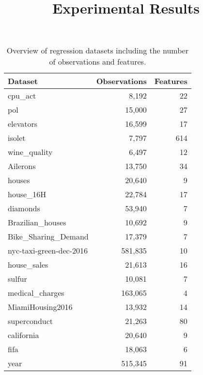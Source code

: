 \documentclass{article}
\begin{document}
\title{Experimental Results}
\author{}
\date{}

\maketitle

\begin{table}[ht]
    \centering
    \begin{tabular}{lrr}
    \hline
    \textbf{Dataset} & \textbf{Observations} & \textbf{Features} \\ \hline
    cpu\_act                & 8,192    & 22  \\
    pol                     & 15,000   & 27  \\
    elevators             & 16,599   & 17  \\
    isolet                  & 7,797    & 614 \\
    wine\_quality          & 6,497    & 12  \\
    Ailerons              & 13,750   & 34  \\
    houses                & 20,640   & 9   \\
    house\_16H            & 22,784   & 17  \\
    diamonds              & 53,940   & 7   \\
    Brazilian\_houses     & 10,692   & 9   \\
    Bike\_Sharing\_Demand  & 17,379   & 7   \\
    nyc-taxi-green-dec-2016& 581,835  & 10  \\
    house\_sales          & 21,613   & 16  \\
    sulfur                & 10,081   & 7   \\
    medical\_charges      & 163,065  & 4   \\
    MiamiHousing2016      & 13,932   & 14  \\
    superconduct          & 21,263   & 80  \\
    california            & 20,640   & 9   \\
    fifa                  & 18,063   & 6   \\
    year                  & 515,345  & 91  \\ \hline
    \end{tabular}
    \caption{Overview of regression datasets including the number of observations and features.}
    \label{tab:datasets}
    \end{table}
    
\end{document}
